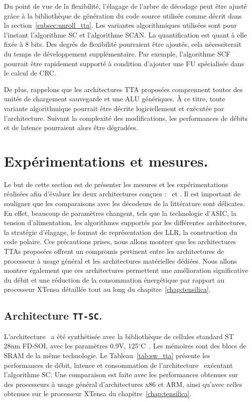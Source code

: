 Du point de vue de la flexibilité, l'élagage de l'arbre de décodage peut être ajusté grâce à la bibliothèque de génération du code source utilisée comme décrit dans la section~\ref{subsec:unroll_tta}. Les variantes algorithmiques utilisées sont pour l'instant l'algorithme SC et l'algorithme SCAN. La quantification est quant à elle fixée à 8 bits. Des degrés de flexibilité pourraient être ajoutés, cela nécessiterait du temps de développement supplémentaire. Par exemple, l'algorithme SCF pourrait être rapidement supporté à condition d'ajouter une FU spécialisée dans le calcul de CRC.

De plus, rappelons que les architectures TTA proposées comprennent toutes des unités de chargement sauvegarde et une ALU génériques. \`A ce titre, toute variante algorithmique pourrait être décrite logiciellement et exécutée par l'architecture. Suivant la complexité des modifications, les performances de débits et de latence pourraient alors être dégradées.

\section{Expérimentations et mesures.}
Le but de cette section est de présenter les mesures et les expérimentations réalisées afin d'évaluer les deux architectures conçues : \TTSC~et \TTSCAN. Il est important de souligner que les comparaisons avec les décodeurs de la littérature sont délicates. En effet, beaucoup de paramètres changent, tels que la technologie d'ASIC, la tension d'alimentation, les algorithmes supportés par les différentes architectures, la stratégie d'élagage, le format de représentation des LLR, la construction du code polaire. Ces précautions prises, nous allons montrer que les architectures TTAs proposées offrent un compromis pertinent entre les architectures de processeur à usage général et les architectures matérielles dédiées. Nous allons montrer également que ces architectures permettent une amélioration significative du débit et une réduction de la consommation énergétique par rapport au processeur XTensa détaillée tout au long du chapitre~\ref{chap:tensilica}.


\subsection{Architecture \texttt{TT-SC}.}
\label{sec:tta_res}

L'architecture \TTSC~a été synthétisée avec la bibliothèque de cellules standard ST 28nm FD-SOI, avec les paramètres 0.9V, 125$^{\circ}$C~\cite{st_fdsoi_2015}. Les mémoires sont des blocs de SRAM de la même technologie. Le Tableau~\ref{tab:sw_tta} présente les performances de débit, latence et consommation de l'architecture \TTSC~exécutant l'algorithme SC. Une comparaison est faite avec les performances obtenues sur des processeurs à usage général d'architectures x86 et ARM, ainsi qu'avec celles obtenues sur le processeur XTensa du chapitre~\ref{chap:tensilica}.


